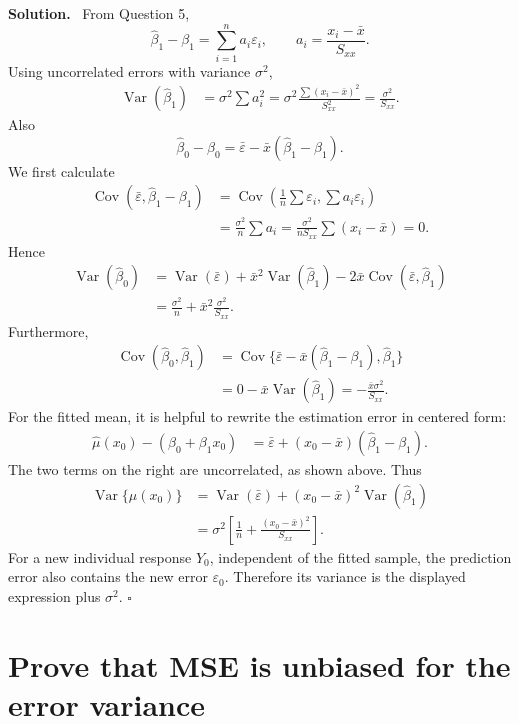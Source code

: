 \documentclass[11pt]{article}
\newcommand{\Sxx}{S_{xx}}
\newcommand{\bzero}{\widehat{\beta}_0}
\newcommand{\bone}{\widehat{\beta}_1}
\newcommand{\Var}{\operatorname{Var}}
\newcommand{\Cov}{\operatorname{Cov}}
\newenvironment{solution}
  {\noindent\color{darkgreen}\textbf{Solution.}\color{black}\ }
  {\hfill$\square$\par\medskip}
\begin{document}
\begin{solution}
From Question 5,
\[
 \bone-\beta_1=\sum_{i=1}^n a_i\varepsilon_i,
 \qquad
 a_i=\frac{x_i-\bar x}{\Sxx}.
\]
Using uncorrelated errors with variance $\sigma^2$,
\begin{align*}
\Var(\bone)
 &=\sigma^2\sum a_i^2
 =\sigma^2\frac{\sum(x_i-\bar x)^2}{\Sxx^2}
 =\frac{\sigma^2}{\Sxx}.
\end{align*}
Also
\[
 \bzero-\beta_0=\bar\varepsilon-\bar x(\bone-\beta_1).
\]
We first calculate
\begin{align*}
\Cov(\bar\varepsilon,\bone-\beta_1)
 &=\Cov\left(\frac1n\sum\varepsilon_i,
        \sum a_i\varepsilon_i\right)\\
 &=\frac{\sigma^2}{n}\sum a_i
 =\frac{\sigma^2}{n\Sxx}\sum(x_i-\bar x)
 =0.
\end{align*}
Hence
\begin{align*}
\Var(\bzero)
 &=\Var(\bar\varepsilon)
  +\bar x^2\Var(\bone)
  -2\bar x\Cov(\bar\varepsilon,\bone)\\
 &=\frac{\sigma^2}{n}+\bar x^2\frac{\sigma^2}{\Sxx}.
\end{align*}
Furthermore,
\begin{align*}
\Cov(\bzero,\bone)
 &=\Cov\{\bar\varepsilon-\bar x(\bone-\beta_1),\bone\}\\
 &=0-\bar x\Var(\bone)
 =-\frac{\bar x\sigma^2}{\Sxx}.
\end{align*}
For the fitted mean, it is helpful to rewrite the estimation error in
centered form:
\begin{align*}
\widehat{\mu}(x_0)-(\beta_0+\beta_1x_0)
 &=\bar\varepsilon+(x_0-\bar x)(\bone-\beta_1).
\end{align*}
The two terms on the right are uncorrelated, as shown above. Thus
\begin{align*}
\Var\{\widehat{\mu}(x_0)\}
 &=\Var(\bar\varepsilon)+(x_0-\bar x)^2\Var(\bone)\\
 &=\sigma^2\left[\frac1n+\frac{(x_0-\bar x)^2}{\Sxx}\right].
\end{align*}
For a new individual response $Y_0$, independent of the fitted sample, the
prediction error also contains the new error $\varepsilon_0$. Therefore its
variance is the displayed expression plus $\sigma^2$.
\end{solution}

\section{Prove that MSE is unbiased for the error variance}
\end{document}
